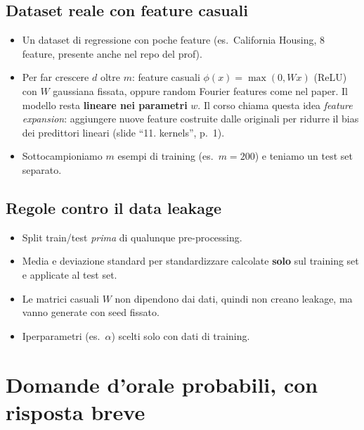\documentclass[11pt,a4paper]{article}
\begin{document}
\subsection{Dataset reale con feature casuali}
\begin{itemize}
  \item Un dataset di regressione con poche feature (es.\ California Housing, 8 feature, presente anche nel repo del prof).
  \item Per far crescere $d$ oltre $m$: feature casuali $\phi(x) = \max(0, Wx)$ (ReLU) con $W$ gaussiana fissata,
        oppure random Fourier features come nel paper. Il modello resta \textbf{lineare nei parametri} $w$.
        Il corso chiama questa idea \emph{feature expansion}: aggiungere nuove feature costruite dalle originali per
        ridurre il bias dei predittori lineari (slide ``11. kernels'', p.~1).
  \item Sottocampioniamo $m$ esempi di training (es.\ $m = 200$) e teniamo un test set separato.
\end{itemize}

\subsection{Regole contro il data leakage}
\begin{itemize}
  \item Split train/test \emph{prima} di qualunque pre-processing.
  \item Media e deviazione standard per standardizzare calcolate \textbf{solo} sul training set e applicate al test set.
  \item Le matrici casuali $W$ non dipendono dai dati, quindi non creano leakage, ma vanno generate con seed fissato.
  \item Iperparametri (es.\ $\alpha$) scelti solo con dati di training.
\end{itemize}

\section{Domande d'orale probabili, con risposta breve}
\end{document}
